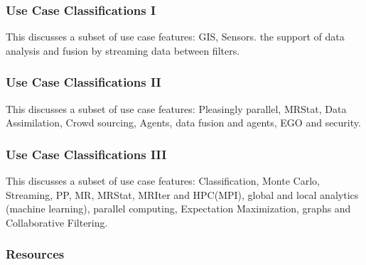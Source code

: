 \subsubsection{Use Case Classifications
I}\label{use-case-classifications-i}

This discusses a subset of use case features: GIS, Sensors. the support
of data analysis and fusion by streaming data between filters.





\subsubsection{Use Case Classifications
II}\label{use-case-classifications-ii}

This discusses a subset of use case features: Pleasingly parallel,
MRStat, Data Assimilation, Crowd sourcing, Agents, data fusion and
agents, EGO and security.





\subsubsection{Use Case Classifications
III}\label{use-case-classifications-iii}

This discusses a subset of use case features: Classification, Monte
Carlo, Streaming, PP, MR, MRStat, MRIter and HPC(MPI), global and local
analytics (machine learning), parallel computing, Expectation
Maximization, graphs and Collaborative Filtering.





\subsubsection{Resources}\label{resources}

